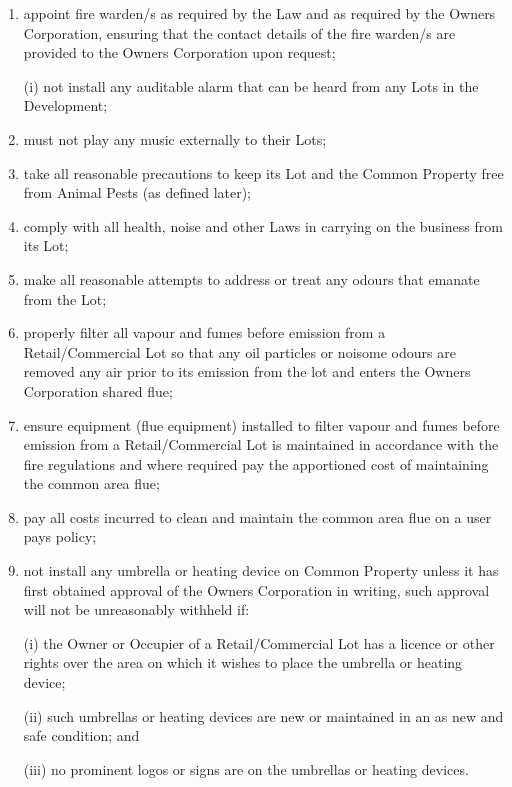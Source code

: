 \documentclass{article}
\begin{document}
\begin{enumerate}[label=\arabic*.]
\begin{enumerate}[label=\arabic{enumi}.\arabic*.]
\begin{enumerate}[label=(\arabic*)]
\begin{enumerate}[label=(\alph*)]
\item  appoint fire warden/s as required by the Law and as required by the Owners Corporation, ensuring that the contact details of the fire warden/s are provided to the Owners Corporation upon request;

(i) not install any auditable alarm that can be heard from any Lots in the Development;

\item  must not play any music externally to their Lots;

\item  take all reasonable precautions to keep its Lot and the Common Property free from Animal Pests (as defined later);

\item  comply with all health, noise and other Laws in carrying on the business from its Lot;

\item  make all reasonable attempts to address or treat any odours that emanate from the Lot;

\item  properly filter all vapour and fumes before emission from a Retail/Commercial Lot so that any oil particles or noisome odours are removed any air prior to its emission from the lot and enters the Owners Corporation shared flue;

\item  ensure equipment (flue equipment) installed to filter vapour and fumes before emission from a Retail/Commercial Lot is maintained in accordance with the fire regulations and where required pay the apportioned cost of maintaining the common area flue;

\item  pay all costs incurred to clean and maintain the common area flue on a user pays policy;

\item  not install any umbrella or heating device on Common Property unless it has first obtained approval of the Owners Corporation in writing, such approval will not be unreasonably withheld if:

(i) the Owner or Occupier of a Retail/Commercial Lot has a licence or other rights over the area on which it wishes to place the umbrella or heating device;

(ii) such umbrellas or heating devices are new or maintained in an as new and safe condition; and

(iii) no prominent logos or signs are on the umbrellas or heating devices.


\end{enumerate}
\end{enumerate}
\end{enumerate}
\end{enumerate}
\end{document}
